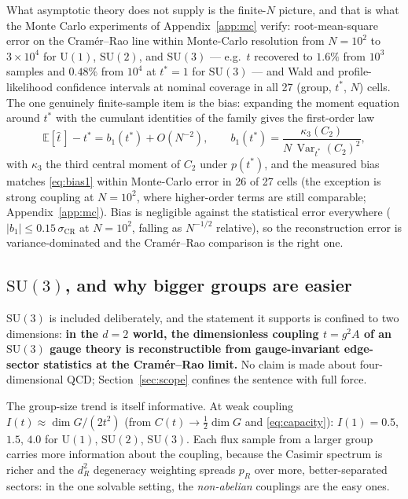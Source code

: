 \documentclass[11pt]{article}
\theoremstyle{remark}
\theoremstyle{plain}
\newcommand{\Var}{\operatorname{Var}}
\newcommand{\dG}{\dim G}
\begin{document}
What asymptotic theory does not supply is the finite-$N$ picture, and that is what the Monte Carlo experiments of Appendix~\ref{app:mc} verify: root-mean-square error on the Cram\'er--Rao line within Monte-Carlo resolution from $N = 10^2$ to $3\times10^4$ for $\mathrm{U}(1)$, $\mathrm{SU}(2)$, and $\mathrm{SU}(3)$ --- e.g.\ $t$ recovered to $1.6\%$ from $10^3$ samples and $0.48\%$ from $10^4$ at $t^* = 1$ for $\mathrm{SU}(3)$ --- and Wald and profile-likelihood confidence intervals at nominal coverage in all 27 (group, $t^*$, $N$) cells. The one genuinely finite-sample item is the bias: expanding the moment equation around $t^*$ with the cumulant identities of the family gives the first-order law
\begin{equation}\label{eq:bias1}
\mathbb{E}[\hat t\,] - t^* = b_1(t^*) + O(N^{-2}), \qquad b_1(t^*) = \frac{\kappa_3(C_2)}{N\,\Var_{t^*}(C_2)^2},
\end{equation}
with $\kappa_3$ the third central moment of $C_2$ under $p(t^*)$, and the measured bias matches \eqref{eq:bias1} within Monte-Carlo error in 26 of 27 cells (the exception is strong coupling at $N = 10^2$, where higher-order terms are still comparable; Appendix~\ref{app:mc}). Bias is negligible against the statistical error everywhere ($|b_1| \leq 0.15\,\sigma_{\mathrm{CR}}$ at $N = 10^2$, falling as $N^{-1/2}$ relative), so the reconstruction error is variance-dominated and the Cram\'er--Rao comparison is the right one.

\subsection{\texorpdfstring{$\mathrm{SU}(3)$}{SU(3)}, and why bigger groups are easier}\label{sec:qcd}

$\mathrm{SU}(3)$ is included deliberately, and the statement it supports is confined to two dimensions: \textbf{in the $d = 2$ world, the dimensionless coupling $t = g^2 A$ of an $\mathrm{SU}(3)$ gauge theory is reconstructible from gauge-invariant edge-sector statistics at the Cram\'er--Rao limit.} No claim is made about four-dimensional QCD; Section~\ref{sec:scope} confines the sentence with full force.

The group-size trend is itself informative. At weak coupling $I(t) \approx \dG/(2t^2)$ (from $C(t) \to \tfrac12\dG$ and \eqref{eq:capacity}): $I(1) = 0.5$, $1.5$, $4.0$ for $\mathrm{U}(1)$, $\mathrm{SU}(2)$, $\mathrm{SU}(3)$. Each flux sample from a larger group carries more information about the coupling, because the Casimir spectrum is richer and the $d_R^2$ degeneracy weighting spreads $p_R$ over more, better-separated sectors: in the one solvable setting, the \emph{non-abelian} couplings are the easy ones.
\end{document}
